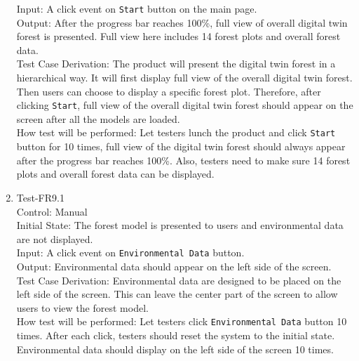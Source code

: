 \documentclass[12pt, titlepage]{article}
\begin{document}
\begin{enumerate}
Input: A click event on \verb|Start| button on the main page.\\

Output: After the progress bar reaches 100\%, full view of overall digital 
twin forest is presented. Full view here includes 14 forest plots and overall forest
data. \\

Test Case Derivation: The product will present the digital twin forest in a 
hierarchical way. It will first display full view of the overall digital twin
forest. Then users can choose to display a specific forest plot. Therefore, after 
clicking \verb|Start|, full view of the overall digital twin forest should
appear on the screen after all the models are loaded. \\
					
How test will be performed: Let testers lunch the product and click \verb|Start| button
for 10 times, full view of the digital twin forest should always appear after the 
progress bar reaches 100\%. Also, testers need to make sure 14 forest plots and 
overall forest data can be displayed.


\item{Test-FR9.1\\}
Control: Manual\\ 

Initial State: The forest model is presented to users and 
environmental data are not displayed.\\

Input: A click event on \verb|Environmental Data| button.\\

Output: Environmental data should appear on the left side of the 
screen.\\

Test Case Derivation: Environmental data are designed to be placed
on the left side of the screen. This can leave the center part 
of the screen to allow users to view the forest model.\\
					
How test will be performed: Let testers click 
\verb|Environmental Data| button 10 times. After each click, testers 
should reset the system to the initial state. Environmental data 
should display on the left side of the screen 10 times.


\end{enumerate}
\end{document}
